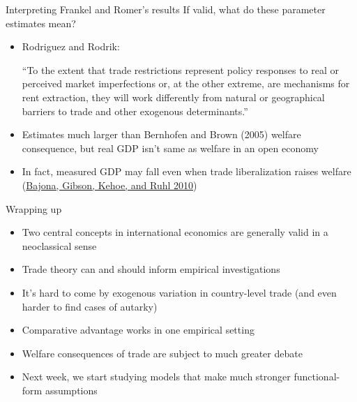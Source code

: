 \documentclass[10pt,notes=hide]{beamer}
\begin{document}
\begin{frame}{Interpreting Frankel and Romer's results}
If valid, what do these parameter estimates mean?
\begin{itemize}
	\item Rodriguez and Rodrik: {``To the extent that trade restrictions represent policy responses to real or perceived market imperfections or, at the other extreme, are mechanisms for rent extraction, they will work differently from natural or geographical barriers to trade and other exogenous determinants.''\par}
	\item Estimates much larger than Bernhofen and Brown (2005) welfare consequence, but real GDP isn't same as welfare in an open economy
	\item In fact, measured GDP may fall even when trade liberalization raises welfare (\href{http://users.econ.umn.edu/~tkehoe/papers/BajonaGibsonKehoeRuhl.pdf}{Bajona, Gibson, Kehoe, and Ruhl 2010})
\end{itemize}
\end{frame}
\begin{frame}{Wrapping up}
\begin{itemize}
	\item Two central concepts in international economics are generally valid in a neoclassical sense
	\item Trade theory can and should inform empirical investigations
	\item It's hard to come by exogenous variation in country-level trade (and even harder to find cases of autarky)
	\item Comparative advantage works in one empirical setting
	\item Welfare consequences of trade are subject to much greater debate
	\item Next week, we start studying models that make much stronger functional-form assumptions
\end{itemize}
\end{frame}
\end{document}
